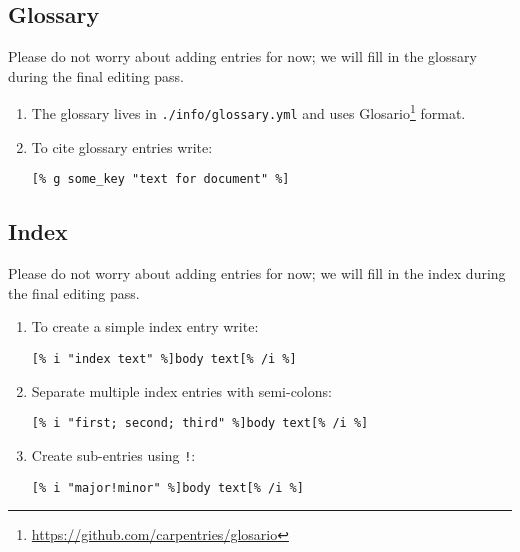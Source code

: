 \documentclass[krantzl]{krantz}
\newcommand{\hreffoot}[2]{{#1}\footnote{\href{#2}{#2}}}
\begin{document}
\subsection*{Glossary}


Please do not worry about adding entries for now;
we will fill in the glossary during the final editing pass.

\begin{enumerate}

\item 

The glossary lives in \texttt{./info/glossary.yml} and uses \hreffoot{Glosario}{https://github.com/carpentries/glosario} format.



\item 

To cite glossary entries write:

\begin{lstlisting}[frame=single,frameround=tttt]
[% g some_key "text for document" %]
\end{lstlisting}



\end{enumerate}

\subsection*{Index}


Please do not worry about adding entries for now;
we will fill in the index during the final editing pass.

\begin{enumerate}

\item 

To create a simple index entry write:

\begin{lstlisting}[frame=single,frameround=tttt]
[% i "index text" %]body text[% /i %]
\end{lstlisting}



\item 

Separate multiple index entries with semi-colons:

\begin{lstlisting}[frame=single,frameround=tttt]
[% i "first; second; third" %]body text[% /i %]
\end{lstlisting}



\item 

Create sub-entries using \texttt{!}:

\begin{lstlisting}[frame=single,frameround=tttt]
[% i "major!minor" %]body text[% /i %]
\end{lstlisting}



\end{enumerate}
\end{document}
